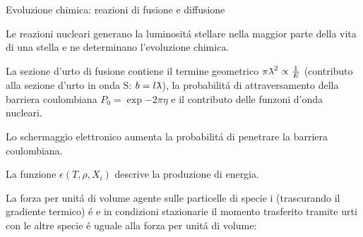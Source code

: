 \documentclass[10pt,xcolor={usenames},fleqn,mathserif,serif]{beamer}
\begin{document}
\begin{wordonframe}{Evoluzione chimica: reazioni di fusione e diffusione}

Le reazioni nucleari generano la luminosit\'a stellare nella maggior parte della vita di una stella e ne determinano l'evoluzione chimica.

La sezione d'urto di fusione contiene il termine geometrico $\pi\lambdabar^2\propto\frac{1}{E}$ (contributo alla sezione d'urto in onda S: $b=l\lambdabar$),  la probabilit\'a di attraversamento della barriera coulombiana $P_0=\exp{-2\pi\eta}$ e il contributo delle funzoni d'onda nucleari.

Lo schermaggio elettronico aumenta la probabilit\'a di penetrare la barriera coulombiana.

La funzione $\epsilon(T,\rho,X_i)$ descrive la produzione di energia.

La forza per unit\'a di volume agente sulle particelle di specie i (trascurando il gradiente termico) \'e
e in condizioni stazionarie il momento trasferito tramite urti con le altre specie \'e uguale alla forza per unit\'a di volume:

\end{wordonframe}



\end{document}
